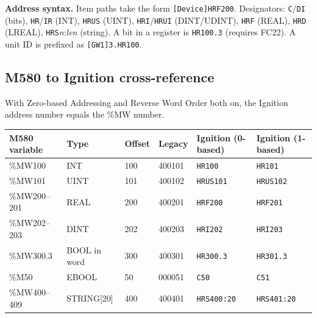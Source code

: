 \textbf{Address syntax.} Item paths take the form \texttt{[Device]HRF200}. Designators: \texttt{C}/\texttt{DI} (bits), \texttt{HR}/\texttt{IR} (INT), \texttt{HRUS} (UINT), \texttt{HRI}/\texttt{HRUI} (DINT/UDINT), \texttt{HRF} (REAL), \texttt{HRD} (LREAL), \texttt{HRS}\textit{n}:\textit{len} (string). A bit in a register is \texttt{HR100.3} (requires FC22). A unit ID is prefixed as \texttt{[GW1]3.HR100}.

\subsection*{M580 to Ignition cross-reference}
With Zero-based Addressing and Reverse Word Order both on, the Ignition address number equals the \%MW number.
\begin{longtable}{@{}P{3.91cm}P{2.39cm}P{1.74cm}P{2.18cm}P{2.82cm}P{2.61cm}@{}}
\toprule
\textbf{M580 variable} & \textbf{Type} & \textbf{Offset} & \textbf{Legacy} & \textbf{Ignition (0-based)} & \textbf{Ignition (1-based)} \\
\midrule
\endhead
\%MW100 & INT & 100 & 400101 & \texttt{HR100} & \texttt{HR101} \\
\%MW101 & UINT & 101 & 400102 & \texttt{HRUS101} & \texttt{HRUS102} \\
\%MW200--201 & REAL & 200 & 400201 & \texttt{HRF200} & \texttt{HRF201} \\
\%MW202--203 & DINT & 202 & 400203 & \texttt{HRI202} & \texttt{HRI203} \\
\%MW300.3 & BOOL in word & 300 & 400301 & \texttt{HR300.3} & \texttt{HR301.3} \\
\%M50 & EBOOL & 50 & 000051 & \texttt{C50} & \texttt{C51} \\
\%MW400--409 & STRING[20] & 400 & 400401 & \texttt{HRS400:20} & \texttt{HRS401:20} \\
\bottomrule
\end{longtable}

